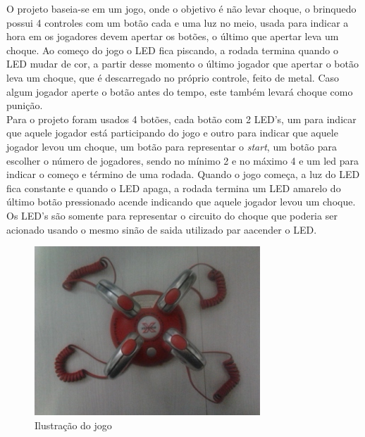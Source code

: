 \documentclass[article]{IEEEtran}
\begin{document}
O projeto baseia-se em um jogo, onde o objetivo é não levar choque, o brinquedo possui 4 controles com um botão cada e uma luz no meio, usada para indicar a hora em os jogadores devem apertar os botões, o último que apertar leva um choque. Ao começo do jogo o LED fica piscando, a rodada termina quando o LED mudar de cor, a partir desse momento o último jogador que apertar o botão leva um choque, que é descarregado no próprio controle, feito de metal. Caso algum jogador aperte o botão antes do tempo, este também levará choque como punição.\\
Para o projeto foram usados 4 botões, cada botão com 2 LED's, um para indicar que aquele jogador está participando do jogo e outro para indicar que aquele jogador levou um choque, um botão para representar o \textit{start}, um botão para escolher o número de jogadores, sendo no mínimo 2 e no máximo 4 e um led para indicar o começo e término de uma rodada. Quando o jogo começa, a luz do LED fica constante e quando o LED apaga, a rodada termina um LED amarelo do último botão pressionado acende indicando que aquele jogador levou um choque. Os LED's são somente para representar o circuito do choque que poderia ser acionado usando o mesmo sinão de saida utilizado par aacender o LED. 

	\begin{figure}	
		\centering
		\includegraphics[scale=8.5cm]{./2012-06-2900.56.14.png}
		\caption{Ilustração do jogo}
 		\label{fig:jogochoque1}
	\end{figure}
\end{document}
